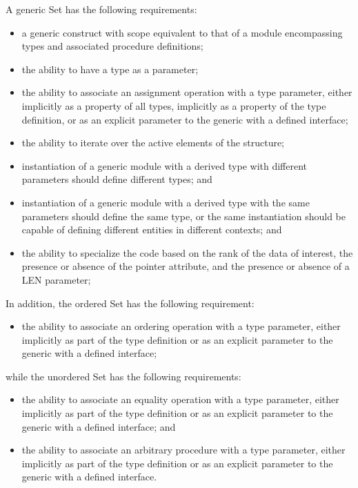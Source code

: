 \documentclass{article}
\newcounter{requirement}
\begin{document}
A generic Set has the following requirements:
\begin{itemize}
\item a generic construct with scope equivalent to that of a module
  encompassing types and associated procedure definitions;

\item the ability to have a type as a parameter;

\item the ability to associate an assignment operation with a type
  parameter, either implicitly as a property of all types, implicitly
  as a property of the type definition, or as an explicit parameter to
  the generic with a defined interface;

\item the ability to iterate over the active elements of the structure;

\item instantiation of a generic module with a derived type with different
  parameters should define different types; and

\item instantiation of a generic module with a derived type with the same
  parameters should define the same type, or the same instantiation
  should be capable of defining different entities in different
  contexts; and

\item the ability to specialize the code based on the rank of the data of 
  interest, the presence or absence of the pointer attribute, and the
  presence or absence of a LEN parameter; 

\end{itemize}
In addition, the ordered Set has the following requirement:
\begin{itemize}

\item the ability to associate an ordering operation with a type
  parameter, either implicitly as part of the type definition or as an
  explicit parameter to the generic with a defined interface;
\end{itemize}
while the unordered Set has the following requirements:
\begin{itemize}
\item the ability to associate an equality operation with a type
  parameter, either implicitly as part of the type definition or as an
  explicit parameter to the generic with a defined interface; and

\item the ability to associate an arbitrary procedure with a type
  parameter, either implicitly as part of the type definition or as an
  explicit parameter to the generic with a defined interface.
\end{itemize}
\end{document}
